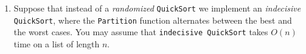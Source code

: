 \documentclass[12pt]{article}
\begin{document}
\renewcommand{\headrulewidth}{0.5pt}
\phantom{Test}


\vspace{-3mm}

\begin{enumerate}

\item Suppose that instead of a {\sl randomized} {\tt QuickSort} we implement
an {\sl indecisive} {\tt QuickSort}, where the {\tt Partition} function
alternates between the best and the worst cases. You may assume that {\tt indecisive QuickSort} takes $O(n)$ time on a list of length $n$.


\end{enumerate}
\end{document}
